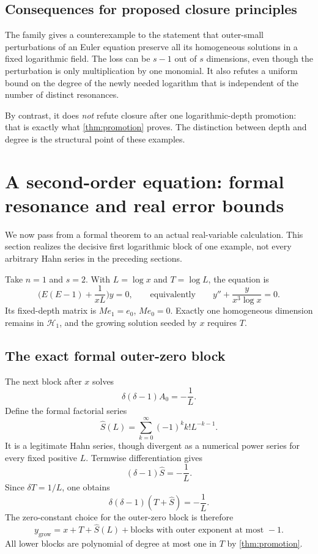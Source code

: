 \documentclass[11pt,a4paper]{article}
\numberwithin{equation}{section}
\theoremstyle{definition}
\theoremstyle{remark}
\newcommand{\HH}{\mathcal H}
\begin{document}
\subsection{Consequences for proposed closure principles}
The family gives a counterexample to the statement that outer-small perturbations of an Euler equation preserve all its homogeneous solutions in a fixed logarithmic field. The loss can be $s-1$ out of $s$ dimensions, even though the perturbation is only multiplication by one monomial. It also refutes a uniform bound on the degree of the newly needed logarithm that is independent of the number of distinct resonances.

By contrast, it does \emph{not} refute closure after one logarithmic-depth promotion: that is exactly what \cref{thm:promotion} proves. The distinction between depth and degree is the structural point of these examples.

\section{A second-order equation: formal resonance and real error bounds}
\label{sec:analytic}
We now pass from a formal theorem to an actual real-variable calculation. This section realizes the decisive first logarithmic block of one example, not every arbitrary Hahn series in the preceding sections.

Take $n=1$ and $s=2$. With $L=\log x$ and $T=\log L$, the equation is
\begin{equation}
 \biggl(E(E-1)+\frac1{xL}\biggr)y=0,
 \qquad\text{equivalently}\qquad
 y''+\frac{y}{x^3\log x}=0.
 \label{eq:analytic-ode}
\end{equation}
Its fixed-depth matrix is $Me_1=e_0$, $Me_0=0$. Exactly one homogeneous dimension remains in $\HH_1$, and the growing solution seeded by $x$ requires $T$.

\subsection{The exact formal outer-zero block}
The next block after $x$ solves
\begin{equation}
 \delta(\delta-1)A_0=-\frac1L.
 \label{eq:a0-equation}
\end{equation}
Define the formal factorial series
\begin{equation}
 \widehat S(L)=\sum_{k=0}^{\infty}(-1)^k k!L^{-k-1}.
 \label{eq:Sformal}
\end{equation}
It is a legitimate Hahn series, though divergent as a numerical power series for every fixed positive $L$. Termwise differentiation gives
\begin{equation}
 (\delta-1)\widehat S=-\frac1L.
 \label{eq:Sformal-ode}
\end{equation}
Since $\delta T=1/L$, one obtains
\[
 \delta(\delta-1)(T+\widehat S)=-\frac1L.
\]
The zero-constant choice for the outer-zero block is therefore
\begin{equation}
 y_{\mathrm{grow}}
 =x+T+\widehat S(L)+\text{blocks with outer exponent at most }-1.
 \label{eq:formal-growing}
\end{equation}
All lower blocks are polynomial of degree at most one in $T$ by \cref{thm:promotion}.
\end{document}
